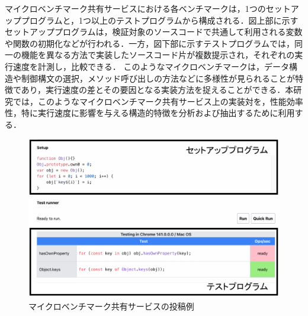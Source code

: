 \documentclass[submit,techrep,noauthor]{ipsj}
\newcommand{\todo}[1]{\colorbox{yellow}{{\bf TODO}:}{\color{red} {\textbf{[#1]}}}}
\begin{document}
マイクロベンチマーク共有サービスにおける各ベンチマークは，1つのセットアッププログラムと，1つ以上のテストプログラムから構成される．図上部に示すセットアッププログラムは，検証対象のソースコードで共通して利用される変数や関数の初期化などが行われる．一方，図下部に示すテストプログラムでは，同一の機能を異なる方法で実装したソースコード片が複数提示され，それぞれの実行速度を計測し，比較できる．
このようなマイクロベンチマークは，データ構造や制御構文の選択，メソッド呼び出しの方法などに多様性が見られることが特徴であり，実行速度の差とその要因となる実装方法を捉えることができる．本研究では，このようなマイクロベンチマーク共有サービス上の実装対を，性能効率性，特に実行速度に影響を与える構造的特徴を分析および抽出するために利用する．

\begin{figure}[!h]
    \centering
    \includegraphics[width=1.0\linewidth]{./Noguchi_fig/jsPerf_example.pdf}
    \caption{マイクロベンチマーク共有サービスの投稿例\protect\footnotemark}
    \label{fig:jsPerf}
\end{figure}


\end{document}
